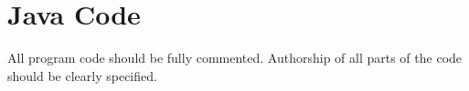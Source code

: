 %
%

\chapter{Java Code}\label{appa:code}
All program code should be fully commented. Authorship
of all parts of the code should be clearly specified. 


